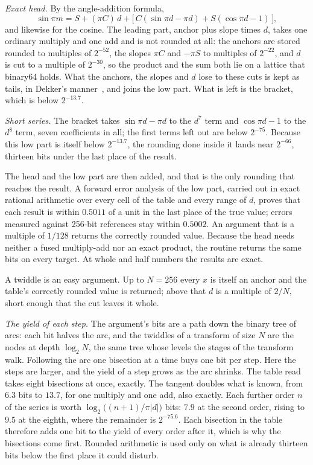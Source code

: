 \documentclass[conference]{IEEEtran}
\begin{document}
\emph{Exact head.}
By the angle-addition formula,
\begin{equation}
\sin\pi m = S + (\pi C)\,d + \bigl[\,C(\sin\pi d-\pi d)+S(\cos\pi d-1)\,\bigr],
\end{equation}
and likewise for the cosine.
The leading part, anchor plus slope times $d$, takes one ordinary multiply and one add and is not rounded at all: the anchors are stored rounded to multiples of $2^{-52}$, the slopes $\pi C$ and $-\pi S$ to multiples of $2^{-22}$, and $d$ is cut to a multiple of $2^{-30}$, so the product and the sum both lie on a lattice that binary64 holds.
What the anchors, the slopes and $d$ lose to these cuts is kept as tails, in Dekker's manner~\cite{dekker}, and joins the low part.
What is left is the bracket, which is below $2^{-13.7}$.

\emph{Short series.}
The bracket takes $\sin\pi d-\pi d$ to the $d^7$ term and $\cos\pi d-1$ to the $d^8$ term, seven coefficients in all; the first terms left out are below $2^{-75}$.
Because this low part is itself below $2^{-13.7}$, the rounding done inside it lands near $2^{-66}$, thirteen bits under the last place of the result.

The head and the low part are then added, and that is the only rounding that reaches the result.
A forward error analysis of the low part, carried out in exact rational arithmetic over every cell of the table and every range of $d$, proves that each result is within $0.5011$ of a unit in the last place of the true value; errors measured against 256-bit references stay within $0.5002$.
An argument that is a multiple of $1/128$ returns the correctly rounded value.
Because the head needs neither a fused multiply-add nor an exact product, the routine returns the same bits on every target.
At whole and half numbers the results are exact.

A twiddle is an easy argument.
Up to $N=256$ every $x$ is itself an anchor and the table's correctly rounded value is returned; above that $d$ is a multiple of $2/N$, short enough that the cut leaves it whole.

\emph{The yield of each step.}
The argument's bits are a path down the binary tree of arcs: each bit halves the arc, and the twiddles of a transform of size $N$ are the nodes at depth $\log_2N$, the same tree whose levels the stages of the transform walk.
Following the arc one bisection at a time buys one bit per step.
Here the steps are larger, and the yield of a step grows as the arc shrinks.
The table read takes eight bisections at once, exactly.
The tangent doubles what is known, from $6.3$ bits to $13.7$, for one multiply and one add, also exactly.
Each further order $n$ of the series is worth $\log_2\bigl((n{+}1)/\pi|d|\bigr)$ bits: $7.9$ at the second order, rising to $9.5$ at the eighth, where the remainder is $2^{-75.6}$.
Each bisection in the table therefore adds one bit to the yield of every order after it, which is why the bisections come first.
Rounded arithmetic is used only on what is already thirteen bits below the first place it could disturb.
\end{document}
